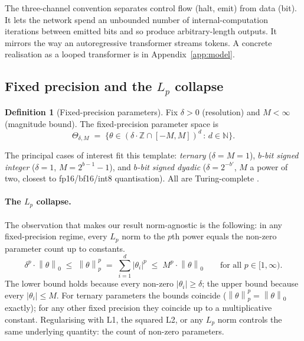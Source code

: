 \documentclass{article}
\theoremstyle{definition}
\newtheorem{definition}[theorem]{Definition}
\newcommand{\Z}{\mathbb{Z}}
\newcommand{\N}{\mathbb{N}}
\newcommand{\norm}[1]{\left\lVert#1\right\rVert}
\newcommand{\Param}{\Theta}
\begin{document}
The three-channel convention separates control flow (halt, emit) from data
(bit). It lets the network spend an unbounded number of internal-computation
iterations between emitted bits and so produce arbitrary-length outputs. It
mirrors the way an autoregressive transformer streams tokens. A concrete
realisation as a looped transformer is in Appendix~\ref{app:model}.

\subsection{Fixed precision and the $L_p$ collapse}\label{sec:setup:precision}

\begin{definition}[Fixed-precision parameters]\label{def:precision}
  Fix $\delta > 0$ (resolution) and $M < \infty$ (magnitude bound). The fixed-precision parameter space is
  \[
    \Param_{\delta, M} \;=\; \bigl\{ \theta \in (\delta \cdot \Z \cap [-M, M])^d \,:\, d \in \N \bigr\}.
  \]
\end{definition}

The principal cases of interest fit this template: \emph{ternary} ($\delta = M
= 1$), \emph{$b$-bit signed integer} ($\delta = 1$, $M = 2^{b-1} - 1$), and
\emph{$b$-bit signed dyadic} ($\delta = 2^{-b'}$, $M$ a power of two, closest
to fp16/bf16/int8 quantisation). All are Turing-complete
\citep{li2025constant,giannou2023looped}.

\paragraph{The $L_p$ collapse.} The observation that makes our result norm-agnostic is the following: in any
fixed-precision regime, every $L_p$ norm to the $p$th power equals the non-zero
parameter count up to constants.
\begin{equation}\label{eq:lp-collapse}
  \delta^p \cdot \norm{\theta}_0 \;\le\; \norm{\theta}_p^p \;=\; \sum_{i=1}^d |\theta_i|^p \;\le\; M^p \cdot \norm{\theta}_0
  \qquad \text{for all } p \in [1, \infty).
\end{equation}
The lower bound holds because every non-zero $|\theta_i| \ge \delta$; the upper bound because every $|\theta_i| \le M$. For ternary parameters the bounds coincide ($\norm{\theta}_p^p = \norm{\theta}_0$ exactly); for any other fixed precision they coincide up to a multiplicative constant. Regularising with L1, the squared L2, or any $L_p$ norm controls the same underlying quantity: the count of non-zero parameters.
\end{document}
